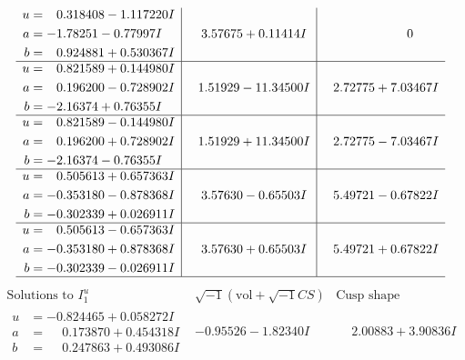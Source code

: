 \documentclass[1p]{elsarticle_modified}
\theoremstyle{definition}
\newcommand{\I}{\sqrt{-1}}
\begin{document}
$$\begin{array}{c|c|c}
\begin{aligned}
u &= \phantom{-}0.318408 - 1.117220 I \\
a &= -1.78251 - 0.77997 I \\
b &= \phantom{-}0.924881 + 0.530367 I\end{aligned}
 & \phantom{-}3.57675 + 0.11414 I & \phantom{-0.000000 } 0 \\ \hline\begin{aligned}
u &= \phantom{-}0.821589 + 0.144980 I \\
a &= \phantom{-}0.196200 - 0.728902 I \\
b &= -2.16374 + 0.76355 I\end{aligned}
 & \phantom{-}1.51929 - 11.34500 I & \phantom{-}2.72775 + 7.03467 I \\ \hline\begin{aligned}
u &= \phantom{-}0.821589 - 0.144980 I \\
a &= \phantom{-}0.196200 + 0.728902 I \\
b &= -2.16374 - 0.76355 I\end{aligned}
 & \phantom{-}1.51929 + 11.34500 I & \phantom{-}2.72775 - 7.03467 I \\ \hline\begin{aligned}
u &= \phantom{-}0.505613 + 0.657363 I \\
a &= -0.353180 - 0.878368 I \\
b &= -0.302339 + 0.026911 I\end{aligned}
 & \phantom{-}3.57630 - 0.65503 I & \phantom{-}5.49721 - 0.67822 I \\ \hline\begin{aligned}
u &= \phantom{-}0.505613 - 0.657363 I \\
a &= -0.353180 + 0.878368 I \\
b &= -0.302339 - 0.026911 I\end{aligned}
 & \phantom{-}3.57630 + 0.65503 I & \phantom{-}5.49721 + 0.67822 I\\
 \hline 
 \end{array}$$\newpage$$\begin{array}{c|c|c}  
\text{Solutions to }I^u_{1}& \I (\text{vol} + \sqrt{-1}CS) & \text{Cusp shape}\\
 \hline 
\begin{aligned}
u &= -0.824465 + 0.058272 I \\
a &= \phantom{-}0.173870 + 0.454318 I \\
b &= \phantom{-}0.247863 + 0.493086 I\end{aligned}
 & -0.95526 - 1.82340 I & \phantom{-}2.00883 + 3.90836 I \\ \hline\begin{aligned}

\end{aligned}
\end{array}$$
\end{document}
